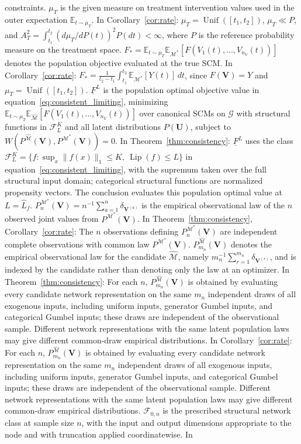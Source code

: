 \documentclass[12pt]{article}
\theoremstyle{plain}
\theoremstyle{definition}
\theoremstyle{remark}
\begin{document}
constraints. $\mu_T$ is the given measure on treatment intervention values used in the outer expectation $\mathbb{E}_{t\sim\mu_T}$. In Corollary~\ref{cor:rate}: $\mu_T=\operatorname{Unif}([t_1,t_2])$, $\mu_T\ll P$, and $A_T^2=\int_{t_1}^{t_2}(d\mu_T/dP(t))^2P(dt)<\infty$, where $P$ is the reference probability measure on the treatment space. $F_*=\mathbb{E}_{t\sim\mu_T}\mathbb{E}_{\mathcal{M}^*}[F(V_1(t),\ldots,V_{n_V}(t))]$ denotes the population objective evaluated at the true SCM. In Corollary~\ref{cor:rate}: $F_*=\frac{1}{t_2-t_1}\int_{t_1}^{t_2}\mathbb{E}_{\mathcal{M}^*}[Y(t)]\,dt$, since $F(\boldsymbol{V})=Y$ and $\mu_T=\operatorname{Unif}([t_1,t_2])$. $\underline{F}^L$ is the population optimal objective value in equation~\ref{eq:consistent_limiting}, minimizing $\mathbb{E}_{t\sim\mu_T}\mathbb{E}_{\hat{\mathcal{M}}}[F(V_1(t),\ldots,V_{n_V}(t))]$ over canonical SCMs on $\mathcal{G}$ with structural functions in $\mathcal{F}_L^K$ and all latent distributions $P(\boldsymbol{U})$, subject to $W(P^{\hat{\mathcal{M}}}(\boldsymbol{V}),P^{\mathcal{M}^*}(\boldsymbol{V}))=0$. In Theorem~\ref{thm:consistency}: $\underline F^L$ uses the class $\mathcal F_L^K=\{f:\sup_x\|f(x)\|_1\leqslant K,\ \operatorname{Lip}(f)\leqslant L\}$ in equation~\ref{eq:consistent_limiting}, with the supremum taken over the full structural input domain; categorical structural functions are normalized propensity vectors. The conclusion evaluates this population optimal value at $L=\hat L_f$. $P_n^{\mathcal{M}^*}(\boldsymbol V)=n^{-1}\sum_{a=1}^n\delta_{\boldsymbol V^{(a)}}$ is the empirical observational law of the $n$ observed joint values from $P^{\mathcal{M}^*}(\boldsymbol V)$. In Theorem~\ref{thm:consistency}, Corollary~\ref{cor:rate}: The $n$ observations defining $P_n^{\mathcal M^*}(\boldsymbol V)$ are independent complete observations with common law $P^{\mathcal M^*}(\boldsymbol V)$. $P_{m_n}^{\hat{\mathcal{M}}}(\boldsymbol{V})$ denotes the empirical observational law for the candidate $\hat{\mathcal{M}}$, namely $m_n^{-1}\sum_{r=1}^{m_n}\delta_{\boldsymbol{V}^{(r)}}$, and is indexed by the candidate rather than denoting only the law at an optimizer. In Theorem~\ref{thm:consistency}: For each $n$, $P_{m_n}^{\hat{\mathcal{M}}}(\boldsymbol{V})$ is obtained by evaluating every candidate network representation on the same $m_n$ independent draws of all exogenous inputs, including uniform inputs, generator Gumbel inputs, and categorical Gumbel inputs; these draws are independent of the observational sample. Different network representations with the same latent population laws may give different common-draw empirical distributions. In Corollary~\ref{cor:rate}: For each $n$, $P_{m_n}^{\hat{\mathcal{M}}}(\boldsymbol{V})$ is obtained by evaluating every candidate network representation on the same $m_n$ independent draws of all exogenous inputs, including uniform inputs, generator Gumbel inputs, and categorical Gumbel inputs; these draws are independent of the observational sample. Different network representations with the same latent population laws may give different common-draw empirical distributions. $\mathcal{F}_{0,n}$ is the prescribed structural network class at sample size $n$, with the input and output dimensions appropriate to the node and with truncation applied coordinatewise. In 
\end{document}

